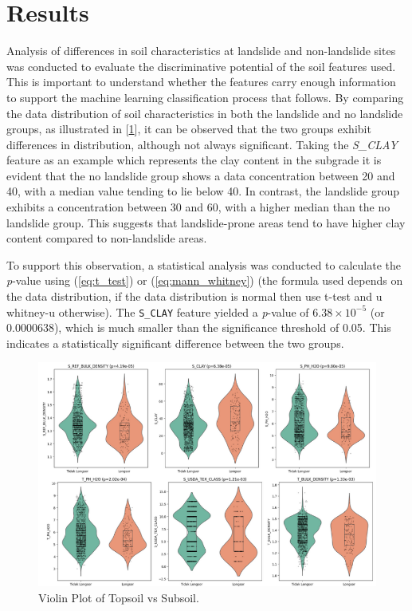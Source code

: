 \section{Results}
Analysis of differences in soil characteristics at landslide and non-landslide sites was conducted to evaluate the discriminative potential of the soil features used. This is important to understand whether the features carry enough information to support the machine learning classification process that follows. By comparing the data distribution of soil characteristics in both the landslide and no landslide groups, as illustrated in [\ref{fig:Violin-plot}], it can be observed that the two groups exhibit differences in distribution, although not always significant. Taking the \textit{S\_CLAY} feature as an example which represents the clay content in the subgrade it is evident that the no landslide group shows a data concentration between 20 and 40, with a median value tending to lie below 40. In contrast, the landslide group exhibits a concentration between 30 and 60, with a higher median than the no landslide group. This suggests that landslide-prone areas tend to have higher clay content compared to non-landslide areas.

To support this observation, a statistical analysis was conducted to calculate the \textit{p}-value using (\ref{eq:t_test}) or (\ref{eq:mann_whitney}) (the formula used depends on the data distribution, if the data distribution is normal then use t-test and u whitney-u otherwise). The \texttt{S\_CLAY} feature yielded a \textit{p}-value of $6.38 \times 10^{-5}$ (or 0.0000638), which is much smaller than the significance threshold of 0.05. This indicates a statistically significant difference between the two groups.

\begin{figure}[htbp]
    \centerline{\includegraphics[width=\linewidth]{fig6.png}}
    \caption{Violin Plot of Topsoil vs Subsoil.}
    \label{fig:Violin-plot}
\end{figure}

